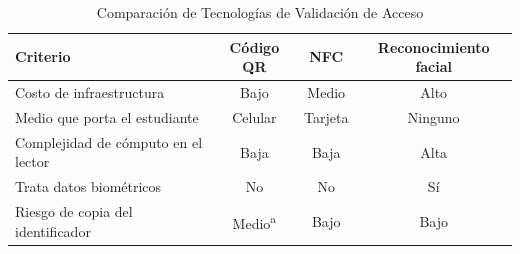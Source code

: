 \begin{table}[tbp]
	\caption{Comparación de Tecnologías de Validación de Acceso}
	\label{tab:just-comparativa}
	\begin{tabular}{lccc}
		\toprule
		Criterio                            & Código QR                & NFC     & Reconocimiento facial \\
		\midrule
		Costo de infraestructura            & Bajo                     & Medio   & Alto                  \\
		Medio que porta el estudiante       & Celular                  & Tarjeta & Ninguno               \\
		Complejidad de cómputo en el lector & Baja                     & Baja    & Alta                  \\
		Trata datos biométricos             & No                       & No      & Sí                    \\
		Riesgo de copia del identificador   & Medio\textsuperscript{a} & Bajo    & Bajo                  \\
		\bottomrule
	\end{tabular}
\end{table}
